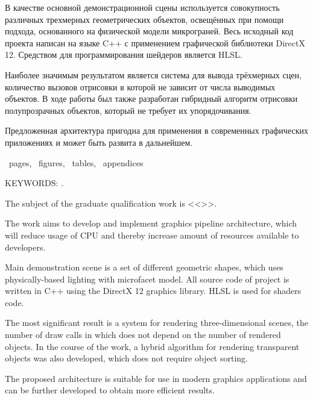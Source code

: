 В качестве основной демонстрационной сцены используется совокупность различных трехмерных геометрических объектов, освещённых при помощи подхода, основанного на физической модели микрограней. Весь исходный код проекта написан на языке C++ с применением графической библиотеки DirectX 12. Средством для программирования шейдеров является HLSL.

Наиболее значимым результатом является система для вывода трёхмерных сцен, количество вызовов отрисовки в которой не зависит от числа выводимых объектов. В ходе работы был также разработан гибридный алгоритм отрисовки полупрозрачных объектов, который не требует их упорядочивания.

Предложенная архитектура пригодна для применения в современных графических приложениях и может быть развита в дальнейшем.


\newpage

\printTheAbstract %


~pages, 
~figures, 
~tables,
~appendices%

{\MakeUppercase{Keywords: \keywordsEn}.} %
	
The subject of the graduate qualification work is <<\thesisTitleEn>>.

The work aims to develop and implement graphics pipeline architecture, which will reduce usage of CPU and thereby increase amount of resources available to developers.

Main demonstration scene is a set of different geometric shapes, which uses physically-based lighting with microfacet model. All source code of project is written in C++ using the DirectX 12 graphics library. HLSL is used for shaders code.

The most significant result is a system for rendering three-dimensional scenes, the number of draw calls in which does not depend on the number of rendered objects. In the course of the work, a hybrid algorithm for rendering transparent objects was also developed, which does not require object sorting.

The proposed architecture is suitable for use in modern graphics applications and can be further developed to obtain more efficient results.
	
	

\newpage
\thispagestyle{empty}
%
